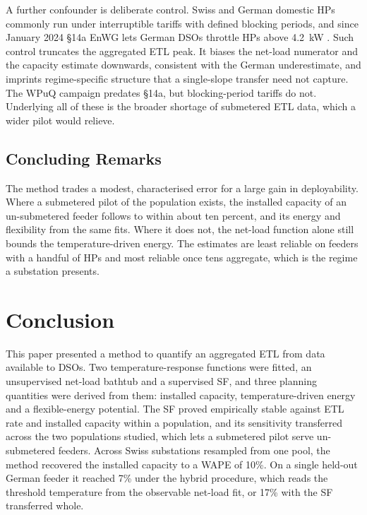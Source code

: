 \documentclass[9pt,journal,a4]{IEEEtran}
\begin{document}
A further confounder is deliberate control. Swiss and German domestic HPs commonly run under interruptible tariffs with defined blocking periods, and since January 2024 {\S}14a EnWG lets German DSOs throttle HPs above 4.2~kW \cite{Bna23}. Such control truncates the aggregated ETL peak. It biases the net-load numerator and the capacity estimate downwards, consistent with the German underestimate, and imprints regime-specific structure that a single-slope transfer need not capture. The WPuQ campaign predates {\S}14a, but blocking-period tariffs do not. Underlying all of these is the broader shortage of submetered ETL data, which a wider pilot would relieve.

\subsection{Concluding Remarks}

The method trades a modest, characterised error for a large gain in deployability. Where a submetered pilot of the population exists, the installed capacity of an un-submetered feeder follows to within about ten percent, and its energy and flexibility from the same fits. Where it does not, the net-load function alone still bounds the temperature-driven energy. The estimates are least reliable on feeders with a handful of HPs and most reliable once tens aggregate, which is the regime a substation presents.

\section{Conclusion}
\label{sec:conclusion}

This paper presented a method to quantify an aggregated ETL from data available to DSOs. Two temperature-response functions were fitted, an unsupervised net-load bathtub and a supervised SF, and three planning quantities were derived from them: installed capacity, temperature-driven energy and a flexible-energy potential. The SF proved empirically stable against ETL rate and installed capacity within a population, and its sensitivity transferred across the two populations studied, which lets a submetered pilot serve un-submetered feeders. Across Swiss substations resampled from one pool, the method recovered the installed capacity to a WAPE of 10\%. On a single held-out German feeder it reached 7\% under the hybrid procedure, which reads the threshold temperature from the observable net-load fit, or 17\% with the SF transferred whole.
\end{document}
